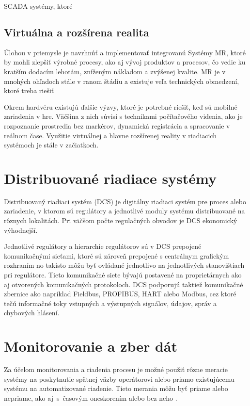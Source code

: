 \documentclass[]{tukediphc}
\begin{document}
SCADA systémy, ktoré 

\subsection{Virtuálna a rozšírena realita}

Úlohou v priemysle je navrhnúť a implementovať integrovanú
Systémy MR, ktoré by mohli zlepšiť výrobné procesy, ako aj vývoj produktov a procesov, čo vedie ku kratším dodacím lehotám, zníženým nákladom a zvýšenej kvalite. MR je v mnohých ohľadoch stále v ranom štádiu a existuje veľa technických obmedzení, ktoré treba riešiť
\citep{soeteMixedRealitySCADA2015}


Okrem hardvéru existujú ďalšie výzvy, ktoré je potrebné riešiť, keď sú mobilné zariadenia v hre. Väčšina z nich súvisí s technikami počítačového videnia, ako je rozpoznanie prostredia bez markérov, dynamická registrácia a spracovanie v reálnom čase. Využitie virtuálnej a hlavne rozšírenej reality v riadiacich systémoch je stále v začiatkoch. 


\section{Distribuované riadiace systémy}

Distribuovaný riadiaci systém (DCS) je digitálny riadiaci systém pre proces alebo zariadenie, v ktorom sú regulátory a jednotlivé moduly systému distribuované na rôznych lokalitách. Pri väčšom počte regulačných obvodov je DCS ekonomický výhodnejší.

Jednotlivé  regulátory a hierarchie regulátorov sú v DCS prepojené komunikačnými sieťami, ktoré sú zároveň prepojené s centrálnym grafickým rozhraním no takisto môžu byť ovládané jednotlivo na jednotlivých stanovištiach pri regulátore. Tieto komunikačné siete bývajú postavené na proprietárnych ako aj otvorených komunikačných protokoloch. DCS podporujú taktiež komunikačné zbernice ako napríklad Fieldbus, PROFIBUS, HART alebo Modbus, cez ktoré tečú informačné toky vstupných a výstupných signálov, údajov, správ a chybových hlásení.

\section{Monitorovanie a zber dát}

Za účelom monitorovania a riadenia procesu je možné použiť rôzne meracie systémy na poskytnutie spätnej väzby operátorovi alebo priamo existujúcemu systému na automatizované riadenie. Tieto merania môžu byť priame alebo nepriame, ako aj~s~časovým oneskorením alebo bez neho \cite{Widlund1998}.
\end{document}

